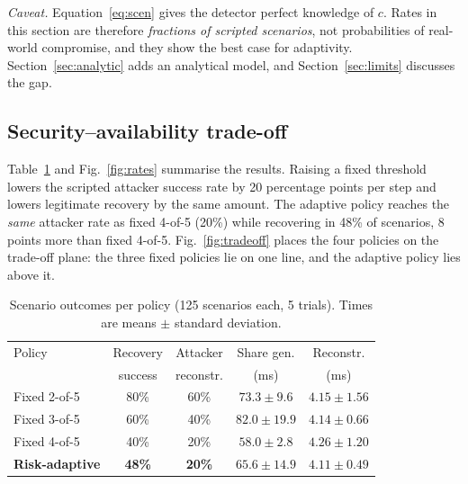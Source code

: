 \documentclass[conference]{IEEEtran}
\begin{document}
\emph{Caveat.} Equation~\eqref{eq:scen} gives the detector perfect knowledge of $c$. Rates in this section are therefore \emph{fractions of scripted scenarios}, not probabilities of real-world compromise, and they show the best case for adaptivity. Section~\ref{sec:analytic} adds an analytical model, and Section~\ref{sec:limits} discusses the gap.

\subsection{Security--availability trade-off}
Table~\ref{tab:summary} and Fig.~\ref{fig:rates} summarise the results. Raising a fixed threshold lowers the scripted attacker success rate by 20 percentage points per step and lowers legitimate recovery by the same amount. The adaptive policy reaches the \emph{same} attacker rate as fixed 4-of-5 (20\%) while recovering in 48\% of scenarios, 8 points more than fixed 4-of-5. Fig.~\ref{fig:tradeoff} places the four policies on the trade-off plane: the three fixed policies lie on one line, and the adaptive policy lies above it.

\begin{table}[t]
\centering
\caption{Scenario outcomes per policy (125 scenarios each, 5 trials). Times are means $\pm$ standard deviation.}
\label{tab:summary}
\setlength{\tabcolsep}{3.5pt}
\begin{tabular}{@{}lcccc@{}}
\toprule
Policy & Recovery & Attacker & Share gen. & Reconstr. \\
       & success  & reconstr. & (ms) & (ms) \\
\midrule
Fixed 2-of-5   & 80\% & 60\% & $73.3\pm 9.6$  & $4.15\pm1.56$ \\
Fixed 3-of-5   & 60\% & 40\% & $82.0\pm 19.9$ & $4.14\pm0.66$ \\
Fixed 4-of-5   & 40\% & 20\% & $58.0\pm 2.8$  & $4.26\pm1.20$ \\
\textbf{Risk-adaptive} & \textbf{48\%} & \textbf{20\%} & $65.6\pm 14.9$ & $4.11\pm0.49$ \\
\bottomrule
\end{tabular}
\end{table}
\end{document}
